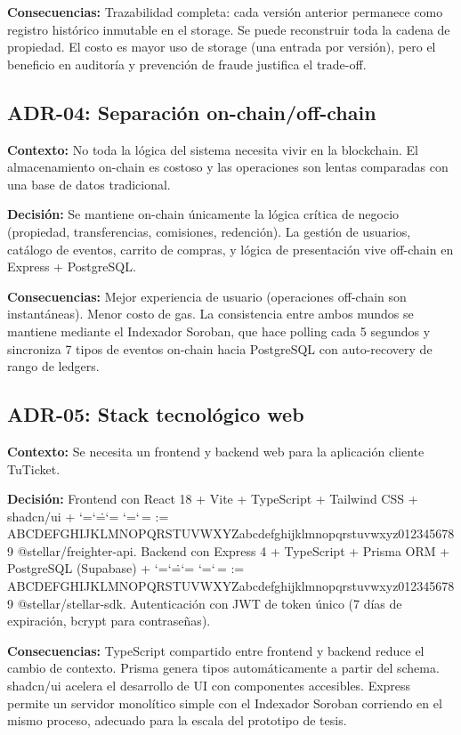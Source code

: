 \documentclass[12pt,oneside]{article}
\makeatletter
\def\ttbreak@uscore{\char95\penalty0\hskip0pt\relax}%
\def\ttbreak@actcat#1{\catcode`#1=\active}%
\def\ttbreak@chars{%
  \catcode`\/=\active \catcode`\.=\active \catcode`\:=\active
  \catcode`\-=\active \catcode`\,=\active
  \@tfor\ttbreak@c:=%
ABCDEFGHIJKLMNOPQRSTUVWXYZabcdefghijklmnopqrstuvwxyz0123456789\do{%
    \expandafter\ttbreak@actcat\ttbreak@c}%
  \let\_\ttbreak@uscore}%
\DeclareRobustCommand{\texttt}{\begingroup\ttfamily\ttbreak@chars\ttbreak@grab}
\def\ttbreak@grab#1{#1\endgroup}
\makeatother
\begin{document}
\textbf{Consecuencias:} Trazabilidad completa: cada versión anterior permanece como registro histórico inmutable en el storage. Se puede reconstruir toda la cadena de propiedad. El costo es mayor uso de storage (una entrada por versión), pero el beneficio en auditoría y prevención de fraude justifica el trade-off.

\subsection{ADR-04: Separación on-chain/off-chain}

\textbf{Contexto:} No toda la lógica del sistema necesita vivir en la blockchain. El almacenamiento on-chain es costoso y las operaciones son lentas comparadas con una base de datos tradicional.

\textbf{Decisión:} Se mantiene on-chain únicamente la lógica crítica de negocio (propiedad, transferencias, comisiones, redención). La gestión de usuarios, catálogo de eventos, carrito de compras, y lógica de presentación vive off-chain en Express + PostgreSQL.

\textbf{Consecuencias:} Mejor experiencia de usuario (operaciones off-chain son instantáneas). Menor costo de gas. La consistencia entre ambos mundos se mantiene mediante el Indexador Soroban, que hace polling cada 5 segundos y sincroniza 7 tipos de eventos on-chain hacia PostgreSQL con auto-recovery de rango de ledgers.

\subsection{ADR-05: Stack tecnológico web}

\textbf{Contexto:} Se necesita un frontend y backend web para la aplicación cliente TuTicket.

\textbf{Decisión:} Frontend con React 18 + Vite + TypeScript + Tailwind CSS + shadcn/ui + \texttt{@stellar/freighter-api}. Backend con Express 4 + TypeScript + Prisma ORM + PostgreSQL (Supabase) + \texttt{@stellar/stellar-sdk}. Autenticación con JWT de token único (7 días de expiración, bcrypt para contraseñas).

\textbf{Consecuencias:} TypeScript compartido entre frontend y backend reduce el cambio de contexto. Prisma genera tipos automáticamente a partir del schema. shadcn/ui acelera el desarrollo de UI con componentes accesibles. Express permite un servidor monolítico simple con el Indexador Soroban corriendo en el mismo proceso, adecuado para la escala del prototipo de tesis.
\end{document}
